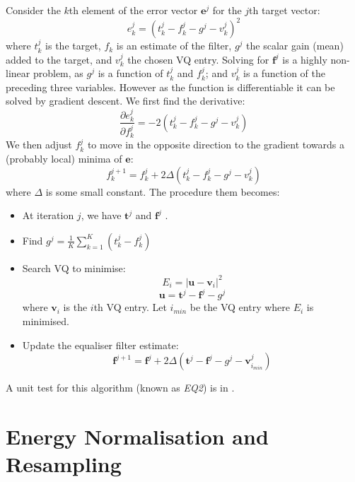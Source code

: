 \documentclass{article}
\begin{document}
Consider the $k$th element of the error vector $\mathbf{e}^j$ for the $j$th target vector:
\begin{equation}
e_k^j=(t_k^j - f_k^j -g^j - v_k^j)^2
\end{equation}
where $t_k^j$ is the target, $f_k$ is an estimate of the filter, $g^j$ the scalar gain (mean) added to the target, and $v_k^j$ the chosen VQ entry.  Solving for $\mathbf{f}^j$ is a highly non-linear problem, as $g^j$ is a function of $t_k^j$ and $f_k^j$; and $v_k^j$ is a function of the preceding three variables.  However as the function is differentiable it can be solved by gradient descent.  We first find the derivative:
\begin{equation}
\frac{\partial e_k^j}{\partial f_k^j} = -2(t_k^j - f_k^j -g^j - v_k^j)
\end{equation}
We then adjust $f_k^j$ to move in the opposite direction to the gradient towards a (probably local) minima of $\mathbf{e}$:
\begin{equation}
f_k^{j+1} = f_k^j + 2 \Delta (t_k^j - f_k^j -g^j - v_k^j)
\end{equation}
where $\Delta$ is some small constant.  The procedure them becomes:
\begin{itemize}
\item At iteration $j$, we have $\mathbf{t}^j$ and $\mathbf{f}^j$ .
\item Find $g^j = \frac{1}{K} \sum_{k=1}^K(t_k^j - f_k^j)$
\item Search VQ to minimise:
\begin{equation}
E_i=|\mathbf{u}-\mathbf{v}_i|^2
\end{equation}
\begin{equation}
\mathbf{u} = \mathbf{t}^j - \mathbf{f}^j -g^j
\end{equation}
where $\mathbf{v}_i$ is the $i$th VQ entry. Let $i_{min}$ be the VQ entry where $E_i$ is minimised.
\item Update the equaliser filter estimate:
\begin{equation}
\mathbf{f}^{j+1} = \mathbf{f}^j + 2 \Delta (\mathbf{t}^j - \mathbf{f}^j - g^j - \mathbf{v}_{i_{min}}^j)
\end{equation}
\end{itemize}

A unit test for this algorithm (known as \emph{EQ2}) is in .

\section{Energy Normalisation and Resampling}
\end{document}
